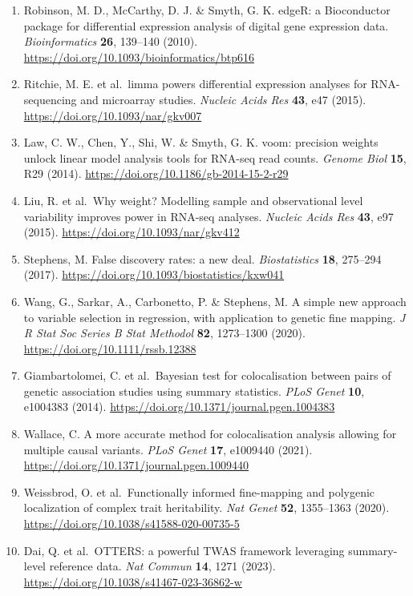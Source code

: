 \begin{enumerate}
\item
  Robinson, M. D., McCarthy, D. J. \& Smyth, G. K. edgeR: a Bioconductor package for differential expression analysis of digital gene expression data. \emph{Bioinformatics} \textbf{26}, 139--140 (2010). \url{https://doi.org/10.1093/bioinformatics/btp616}
\item
  Ritchie, M. E. et al.~limma powers differential expression analyses for RNA-sequencing and microarray studies. \emph{Nucleic Acids Res} \textbf{43}, e47 (2015). \url{https://doi.org/10.1093/nar/gkv007}
\item
  Law, C. W., Chen, Y., Shi, W. \& Smyth, G. K. voom: precision weights unlock linear model analysis tools for RNA-seq read counts. \emph{Genome Biol} \textbf{15}, R29 (2014). \url{https://doi.org/10.1186/gb-2014-15-2-r29}
\item
  Liu, R. et al.~Why weight? Modelling sample and observational level variability improves power in RNA-seq analyses. \emph{Nucleic Acids Res} \textbf{43}, e97 (2015). \url{https://doi.org/10.1093/nar/gkv412}
\item
  Stephens, M. False discovery rates: a new deal. \emph{Biostatistics} \textbf{18}, 275--294 (2017). \url{https://doi.org/10.1093/biostatistics/kxw041}
\item
  Wang, G., Sarkar, A., Carbonetto, P. \& Stephens, M. A simple new approach to variable selection in regression, with application to genetic fine mapping. \emph{J R Stat Soc Series B Stat Methodol} \textbf{82}, 1273--1300 (2020). \url{https://doi.org/10.1111/rssb.12388}
\item
  Giambartolomei, C. et al.~Bayesian test for colocalisation between pairs of genetic association studies using summary statistics. \emph{PLoS Genet} \textbf{10}, e1004383 (2014). \url{https://doi.org/10.1371/journal.pgen.1004383}
\item
  Wallace, C. A more accurate method for colocalisation analysis allowing for multiple causal variants. \emph{PLoS Genet} \textbf{17}, e1009440 (2021). \url{https://doi.org/10.1371/journal.pgen.1009440}
\item
  Weissbrod, O. et al.~Functionally informed fine-mapping and polygenic localization of complex trait heritability. \emph{Nat Genet} \textbf{52}, 1355--1363 (2020). \url{https://doi.org/10.1038/s41588-020-00735-5}
\item
  Dai, Q. et al.~OTTERS: a powerful TWAS framework leveraging summary-level reference data. \emph{Nat Commun} \textbf{14}, 1271 (2023). \url{https://doi.org/10.1038/s41467-023-36862-w}

\end{enumerate}
